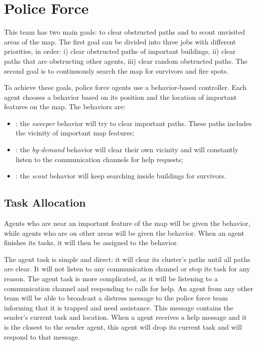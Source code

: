 \section{Police Force}
\label{sec:police}
This team has two main goals: to clear obstructed paths and to scout unvisited areas of the map. The first goal can be divided into three jobs with different priorities, in order: i) clear obstructed paths of important buildings, ii) clear paths that are obstructing other agents, iii) clear random obstructed paths. The second goal is to continuously search the map for survivors and fire spots.

To achieve these goals, police force agents use a behavior-based controller. Each agent chooses a behavior based on its position and the location of important features on the map. The behaviors are:

\begin{itemize}

  \item {}: the \textit{sweeper} behavior will try to clear important paths. These paths includes the vicinity of important map features;

  \item {}: the \textit{by-demand} behavior will clear their own vicinity and will constantly listen to the communication channels for help requests;

  \item {}: the \textit{scout} behavior will keep searching inside buildings for survivors.

\end{itemize}


\subsection{Task Allocation}
Agents who are near an important feature of the map will be given the  behavior, while agents who are on other areas will be given the  behavior. When an agent finishes its tasks, it will then be assigned to the  behavior.

The  agent task is simple and direct: it will clear its cluster's paths until all paths are clear. It will not listen to any communication channel or stop its task for any reason. The  agent task is more complicated, as it will be listening to a communication channel and responding  to calls for help. An agent from any other team will be able to broadcast a distress message to the police force team informing that it is trapped and need assistance. This message contains the sender's current task and location. When a  agent receives a help message and it is the closest to the sender agent, this  agent will drop its current task and will respond to that message.


